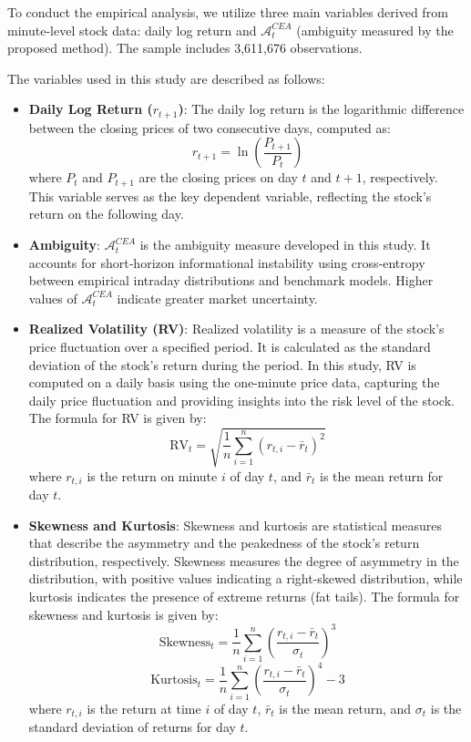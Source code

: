 \documentclass[preprint,12pt,authoryear]{elsarticle}
\begin{document}
To conduct the empirical analysis, we utilize three main variables derived from minute-level stock data: daily log return and \(\mathcal{A}^{CEA}_t\) (ambiguity measured by the proposed method). The sample includes 3,611,676 observations.

The variables used in this study are described as follows:

\begin{itemize}
    \item \textbf{Daily Log Return ($r_{t+1}$)}: The daily log return is the logarithmic difference between the closing prices of two consecutive days, computed as:
    \[
    r_{t+1} = \ln\left(\frac{P_{t+1}}{P_t}\right)
    \]
    where $P_t$ and $P_{t+1}$ are the closing prices on day $t$ and $t+1$, respectively. This variable serves as the key dependent variable, reflecting the stock's return on the following day.

    \item \textbf{Ambiguity}: \(\mathcal{A}^{CEA}_t\) is the ambiguity measure developed in this study. It accounts for short‑horizon informational instability using cross‑entropy between empirical intraday distributions and benchmark models. Higher values of \(\mathcal{A}^{CEA}_t\) indicate greater market uncertainty.

    \item \textbf{Realized Volatility (RV)}: Realized volatility is a measure of the stock's price fluctuation over a specified period. It is calculated as the standard deviation of the stock's return during the period. In this study, RV is computed on a daily basis using the one-minute price data, capturing the daily price fluctuation and providing insights into the risk level of the stock. The formula for RV is given by:
    \[
    \mathrm{RV}_t = \sqrt{\frac{1}{n} \sum_{i=1}^{n} (r_{t,i} - \bar{r}_t)^2}
    \]
    where $r_{t,i}$ is the return on minute $i$ of day $t$, and $\bar{r}_t$ is the mean return for day $t$.

    \item \textbf{Skewness and Kurtosis}: Skewness and kurtosis are statistical measures that describe the asymmetry and the peakedness of the stock's return distribution, respectively. Skewness measures the degree of asymmetry in the distribution, with positive values indicating a right-skewed distribution, while kurtosis indicates the presence of extreme returns (fat tails). The formula for skewness and kurtosis is given by:
    \[
    \text{Skewness}_t = \frac{1}{n} \sum_{i=1}^{n} \left( \frac{r_{t,i} - \bar{r}_t}{\sigma_t} \right)^3
    \]
    \[
    \text{Kurtosis}_t = \frac{1}{n} \sum_{i=1}^{n} \left( \frac{r_{t,i} - \bar{r}_t}{\sigma_t} \right)^4 - 3
    \]
    where $r_{t,i}$ is the return at time $i$ of day $t$, $\bar{r}_t$ is the mean return, and $\sigma_t$ is the standard deviation of returns for day $t$.


\end{itemize}
\end{document}
